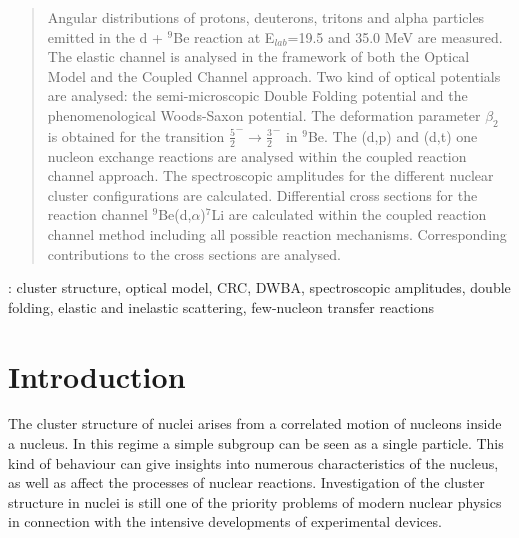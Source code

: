 \documentclass[10pt]{iopart}
\begin{document}
\begin{abstract}
Angular distributions of protons, deuterons, tritons and alpha particles emitted in the d + $^{9}$Be reaction  at E$_{lab}$=19.5 and 35.0 MeV are measured. The elastic channel is analysed in the framework of both the Optical Model and  the Coupled Channel approach. Two kind of optical potentials are analysed: the semi-microscopic Double Folding potential and the phenomenological Woods-Saxon potential. The deformation parameter $\beta_2$ is obtained for the transition $\frac{5}{2}^{-} \rightarrow \frac{3}{2}^{-} $ in ${}^9$Be. The (d,p) and (d,t) one nucleon exchange reactions are analysed within the coupled reaction channel approach. The spectroscopic amplitudes for the different nuclear cluster configurations are calculated. Differential cross sections for the reaction channel ${}^9$Be(d,$\alpha$)${}^7$Li are calculated within the coupled reaction channel method including  all possible reaction mechanisms. Corresponding contributions to the cross sections are analysed.
\end{abstract}
%
\vspace{2pc}
: cluster structure, optical model, CRC, DWBA, spectroscopic amplitudes, double folding, elastic and inelastic scattering, few-nucleon transfer reactions
%
%
\maketitle
%
\ioptwocol
%

\section{Introduction}
The cluster structure of nuclei arises from a correlated motion of nucleons inside a nucleus. In this regime a simple subgroup can be seen as a single particle. This kind of behaviour can give insights into numerous characteristics of the nucleus, as well as affect the processes of nuclear reactions. Investigation of the cluster structure in nuclei is still one of the priority problems of modern nuclear physics in connection with the intensive developments of experimental devices.
\end{document}

